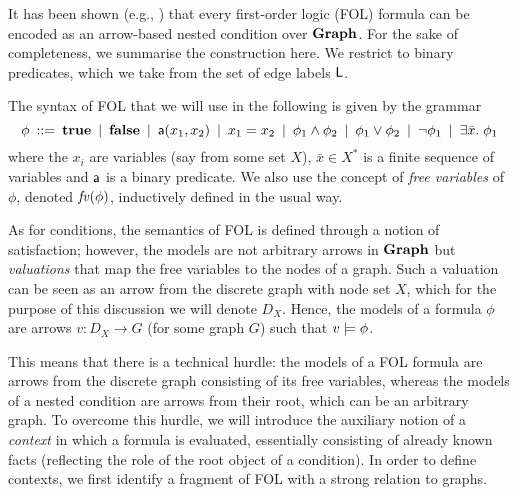It has been shown (e.g., \cite{Rensink-FOL,Habel-FOL}) that every first-order logic (FOL) formula can be encoded as an arrow-based nested condition over $\textbf{Graph}$. For the sake of completeness, we summarise the construction here. We restrict to binary predicates, which we take from the set of edge labels $\mathsf{L}$.

The syntax of FOL that we will use in the following is given by the grammar
%
\[ \phi \:::=\: \textbf{true}
        \:\mid\: \textbf{false}
		\:\mid\: \mathsf{a}(x_1,x_2)
        \:\mid\: x_1=x_2
		\:\mid\: \phi_1\wedge \phi_2
		\:\mid\: \phi_1\vee \phi_2
		\:\mid\: \neg\phi_1
		\:\mid\: \exists \bar x.\; \phi_1 
		\]
where the $x_i$ are variables (say from some set $X$), $\bar x\in X^*$ is a finite sequence of variables and $\mathsf{a}$ is a binary predicate. We also use the concept of \emph{free variables} of $\phi$, denoted $\mathit{fv}(\phi)$, inductively defined in the usual way.

\iffull
As for conditions, the semantics of FOL is defined through a notion of satisfaction; however, the models are not arbitrary arrows in $\textbf{Graph}$ but \emph{valuations} that map the free variables to the nodes of a graph. Such a valuation can be seen as an arrow from the discrete graph with node set $X$, which for the purpose of this discussion we will denote $D_X$. Hence, the models of a formula $\phi$ are arrows $v:D_X\to G$ (for some graph $G$) such that $v\models\phi$.

This means that there is a technical hurdle: the models of a FOL formula are arrows from the discrete graph consisting of its free variables, whereas the models of a nested condition are arrows from their root, which can be an arbitrary graph. To overcome this hurdle, we will introduce the auxiliary notion of a \emph{context} in which a formula is evaluated, essentially consisting of already known facts (reflecting the role of the root object of a condition). In order to define contexts, we first identify a fragment of FOL with a strong relation to graphs.

